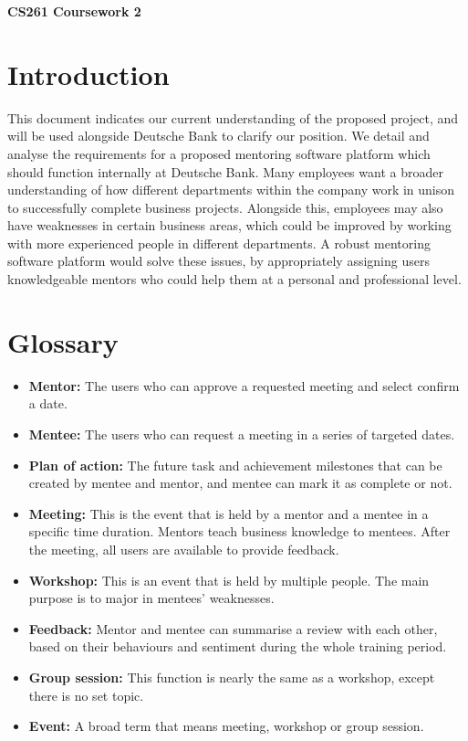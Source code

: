 \documentclass[10pt]{article}
\begin{document}
\begin{center}
    \Huge\textbf{CS261 Coursework 2}\\
\end{center}


\vspace{-6mm}\section{Introduction}\vspace{-2mm}
This document indicates our current understanding of the proposed project, and
will be used alongside Deutsche Bank to clarify our position. We detail and
analyse the requirements for a proposed mentoring software platform which should
function internally at Deutsche Bank. Many employees want a broader
understanding of how different departments within the company work in unison to
successfully complete business projects. Alongside this, employees may also have
weaknesses in certain business areas, which could be improved by working with
more experienced people in different departments. A robust mentoring software
platform would solve these issues, by appropriately assigning users
knowledgeable mentors who could help them at a personal and professional level.

\vspace{-4mm}\section{Glossary}\vspace{-2mm}
\begin{itemize}[leftmargin=1.2cm,noitemsep,align=left]
    \item
        \textbf{Mentor:} The users who can approve a requested meeting and
        select confirm a date.
    \item
        \textbf{Mentee:} The users who can request a meeting in a series of
        targeted dates.
    \item
        \textbf{Plan of action:} The future task and achievement milestones that
        can be created by mentee and mentor, and mentee can mark it as complete
        or not.
    \item
        \textbf{Meeting:} This is the event that is held by a mentor and a mentee
        in a specific time duration. Mentors teach business knowledge to
        mentees. After the meeting, all users are available to provide feedback.
    \item
        \textbf{Workshop:} This is an event that is held by multiple people. The
        main purpose is to major in mentees' weaknesses.
    \item
        \textbf{Feedback:} Mentor and mentee can summarise a review with each
        other, based on their behaviours and sentiment during the whole training
        period.
    \item
        \textbf{Group session:} This function is nearly the same as a workshop,
        except there is no set topic.
    \item
        \textbf{Event:} A broad term that means meeting, workshop or group session.
\end{itemize}
\end{document}
